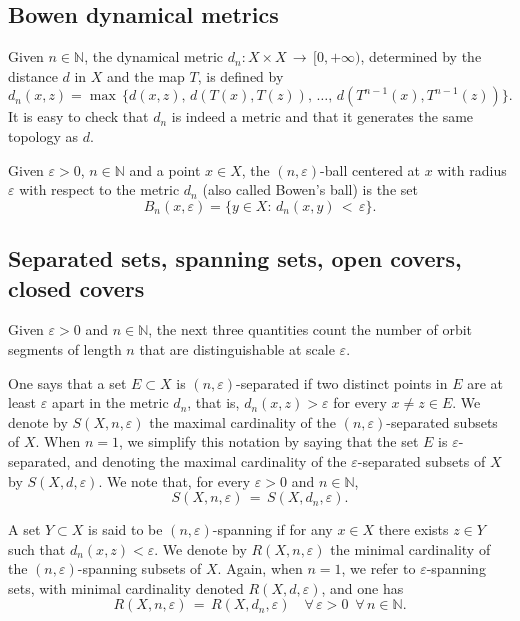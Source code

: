 \documentclass[11pt,a4paper,reqno]{amsart}
\theoremstyle{plain}
\theoremstyle{definition}
\newcommand{\vep}{\varepsilon}
\begin{document}
\subsection{Bowen dynamical metrics}\label{sse:nball}

Given $n\in \mathbb{N}$, the dynamical metric $d_n \colon X \times X \, \to \,[0,+\infty)$, determined by the distance $d$ in $X$ and the map $T$, is defined by 
\begin{equation}\label{def:Bdn}
d_n(x,z)=\max\,\Big\{d(x,z),\,d(T(x),T(z)),\,\dots,\,d(T^{n-1}(x),T^{n-1}(z))\Big\}.
\end{equation}
It is easy to check that $d_n$ is indeed a metric and that it generates the same topology as $d$. 

Given $\varepsilon > 0$, $n \in \mathbb{N}$ and a point $x \in X$, the $(n, \varepsilon)$-ball centered at $x$ with radius $\vep$ with respect to the metric $d_n$ (also called Bowen's ball) is the set
\begin{equation}\label{eq:ball}
\mathit{B}_{n}(x, \vep) = \{y \in X \colon \,d_n( x, y) \, < \, \vep\}.
\end{equation}


\subsection{Separated sets, spanning sets, open covers, closed covers}\label{sse:sepspacov}

Given $\varepsilon > 0$ and $n \in \mathbb{N}$, the next three quantities count the number of orbit segments of length $n$ that are distinguishable at scale $\vep$.

One says that a set $E \subset X$ is $(n,\varepsilon)$-separated if two distinct points in $E$ are at least $\vep$ apart in the metric $d_n$, that is, $d_n(x,z) > \varepsilon$ for every $x\neq z \in E$. We denote by $S(X, n,\varepsilon)$ the maximal cardinality of the $(n,\varepsilon)$-separated subsets of $X$. When $n=1$, we simplify this notation by saying that the set $E$ is $\varepsilon$-separated, and denoting the maximal cardinality of the $\vep$-separated subsets of $X$ by $S(X,d,\vep)$. We note that, for every $\vep>0$ and $n\in\mathbb N$,
$$S(X, n, \vep) \,=\, S(X, d_n,\vep).$$

A set $Y\subset X$ is said to be $(n,\varepsilon)$-spanning if for any $x\in X$ there exists $z\in Y$ such that $d_n(x,z)<\varepsilon$. We denote by $R(X,n,\varepsilon)$ the minimal cardinality of the $(n,\varepsilon)$-spanning subsets of $X$. Again, when $n=1$, we refer to $\varepsilon$-spanning sets, with minimal cardinality denoted $R(X, d,\vep)$, and one has
$$R(X, n, \vep) \,=\, R(X, d_n,\vep) \quad \forall \,\vep>0 \,\,\,\forall\, n\in\mathbb{N}.$$
\end{document}

